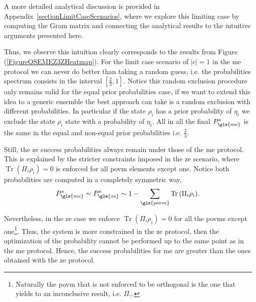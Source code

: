 \documentclass[12pt,letterpaper]{article}
\DeclareMathOperator{\tr}{Tr}
\begin{document}
A more detailed analytical discussion is provided in Appendix~\ref{sectionLimitCaseScenarios}, where we explore this limiting case by computing the Gram matrix and connecting the analytical results to the intuitive arguments presented here. 

Thus, we observe this intuition clearly corresponds to the results from Figure (\ref{FigureQSEMEZ3ZHeatmap}). For the limit case scenario of $|c|=1$ in the \gls{me} protocol we can never do better than taking a random guess, i.e. the probabilities spectrum consists in the interval $[\frac{2}{3},1]$. Notice this random exclusion procedure only remains valid for the equal prior probabilities case, if we want to extend this idea to a generic ensemble the best approach can take is a random exclusion with different probabilities. In particular if the state $\rho_i$ has a prior probability of $\eta_i$ we exclude the state $\rho_i$ state with a probability of $\eta_i$. All in all the final $P_{\gls{me}}^s$ is the same in the equal and non-equal prior probabilities i.e. $\frac{2}{3}$.

Still, the \gls{ze} success probabilities always remain under those of the \gls{me} protocol. This is explained by the stricter constraints imposed in the \gls{ze} scenario, where $\tr(\Pi_i\rho_i) = 0$ is enforced for all \gls{povm} elements except one. Notice both probabilities are computed in a completely symmetric way,
\begin{align*}
	P^s_{\gls{me}}\sim P^s_{\gls{ze}}\sim 1-\sum_{\gls{povm}}\tr{(\Pi_i\rho_i)}.
\end{align*}

Nevertheless, in the \gls{ze} case we enforce $\tr{(\Pi_i\rho_i)}=0$ for all the \glspl{povm} except one\footnote{Naturally the \gls{povm} that is not enforced to be orthogonal is the one that yields to an inconclusive result, i.e. $\Pi_?$.}. Thus, the system is more constrained in the \gls{ze} protocol, then the optimization of the probability cannot be performed up to the same point as in the \gls{me} protocol. Hence, the success probabilities for \gls{me} are greater than the ones obtained with the \gls{ze} protocol.
\end{document}
